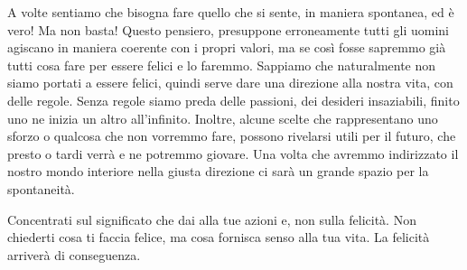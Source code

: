 \documentclass[12pt]{book} %
\begin{document}
A volte sentiamo che bisogna fare quello che si sente, in maniera spontanea, ed è vero! Ma non basta! Questo pensiero,
presuppone erroneamente tutti gli uomini agiscano in maniera coerente con i propri valori, ma se così fosse sapremmo
già tutti cosa fare per essere felici e lo faremmo. Sappiamo che naturalmente non siamo portati a essere felici, quindi
serve dare una direzione alla nostra vita, con delle regole. Senza regole siamo preda delle passioni, dei desideri
insaziabili, finito uno ne inizia un altro all'infinito. Inoltre, alcune scelte che rappresentano
uno sforzo o qualcosa che non vorremmo fare, possono rivelarsi utili per il futuro, che presto o tardi verrà e ne
potremmo giovare. Una volta che avremmo indirizzato il nostro mondo interiore nella giusta direzione ci sarà un grande
spazio per la spontaneità.

Concentrati sul significato che dai alla tue azioni e, non sulla felicità. Non chiederti cosa ti faccia felice, ma cosa
fornisca senso alla tua vita. La felicità arriverà di conseguenza.
\end{document}

